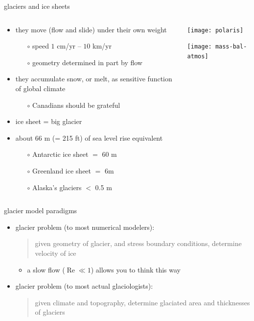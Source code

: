 \documentclass[xcolor={dvipsnames}]{beamer}
\begin{document}
\begin{frame}{glaciers and ice sheets}

\begin{columns}
\begin{column}{0.45\textwidth}
\begin{itemize}
\small
\item they move (flow and slide) under their own weight
  \begin{itemize}
  \scriptsize
  \item[$\circ$] speed $1$ cm/yr -- $10$ km/yr
  \item[$\circ$] geometry determined in part by flow
  \end{itemize}
\small
\item they accumulate snow, or melt, as sensitive function of global climate
  \begin{itemize}
  \scriptsize
  \item[$\circ$] Canadians should be grateful
  \end{itemize}
\small
\item ice sheet = big glacier
\small
\item about 66 m (= 215 ft) of sea level rise equivalent
  \begin{itemize}
  \scriptsize
  \item[$\circ$] Antarctic ice sheet $=$ 60 m
  \item[$\circ$] Greenland ice sheet $=$ 6m
  \item[$\circ$] Alaska's glaciers $<$ 0.5 m
  \end{itemize}
\end{itemize}
\end{column}
\begin{column}{0.55\textwidth}
\texttt{[image: polaris]}

\texttt{[image: mass-bal-atmos]}
\end{column}
\end{columns}
\end{frame}


\begin{frame}{glacier model paradigms}

\begin{itemize}
\item<1-2> glacier problem \alert<1-2>{(to most numerical modelers)}:
   \begin{quote}
   given geometry of glacier, and stress boundary conditions, determine velocity of ice
   \end{quote}
\vspace{-4mm}
  \begin{itemize}
  \item<2>[$\circ$] a slow flow ($\operatorname{Re} \ll 1$) allows you to think this way
  \end{itemize}

\bigskip
\item<3> glacier problem \alert<3>{(to most actual glaciologists)}:
   \begin{quote}
   given climate and topography, determine glaciated area and thicknesses of glaciers
   \end{quote}
\end{itemize}
\end{frame}
\end{document}
